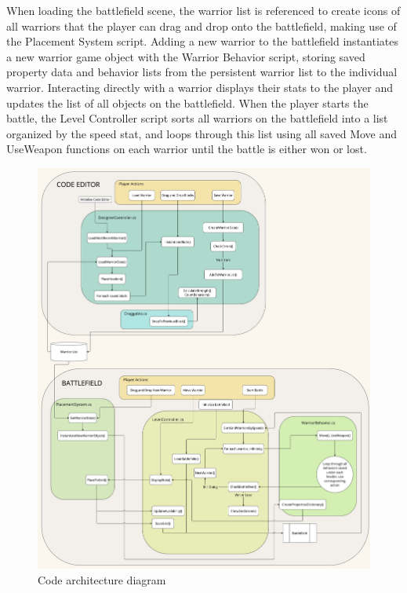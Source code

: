 \documentclass[10pt,twocolumn]{article}
\begin{document}
When loading the battlefield scene, the warrior list is referenced to create icons of all warriors that the player can drag and drop onto the battlefield, making use of the Placement System script. Adding a new warrior to the battlefield instantiates a new warrior game object with the Warrior Behavior script, storing saved property data and behavior lists from the persistent warrior list to the individual warrior. Interacting directly with a warrior displays their stats to the player and updates the list of all objects on the battlefield. When the player starts the battle, the Level Controller script sorts all warriors on the battlefield into a list organized by the speed stat, and loops through this list using all saved Move and UseWeapon functions on each warrior until the battle is either won or lost.
\begin{figure}
    \centering
    \includegraphics[width=\linewidth]{images/architecture-diagram.jpg}
    \caption{Code architecture diagram}
    \label{fig:architecture-diagram}
\end{figure}





~\\~\\

\sloppy
\printbibliography
\end{document}
